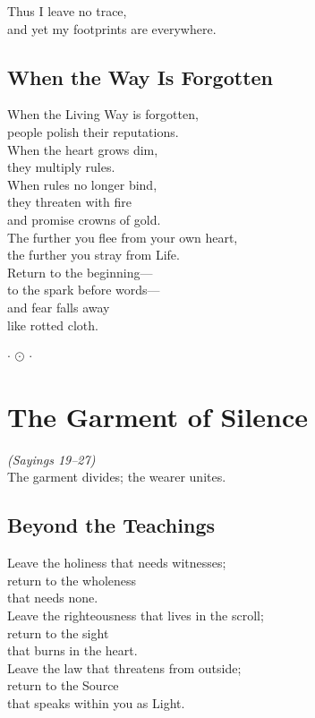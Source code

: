 \documentclass[10pt, openright]{book}
\newcommand{\ornament}{
    \vspace{1.5cm}
    \begin{center}
        \large $\cdot$ $\odot$ $\cdot$
    \end{center}
    \vspace{1.5cm}
}
\begin{document}
Thus I leave no trace, \\
and yet my footprints are everywhere.

\section{When the Way Is Forgotten}
When the Living Way is forgotten, \\
people polish their reputations. \\
When the heart grows dim, \\
they multiply rules. \\
When rules no longer bind, \\
they threaten with fire \\
and promise crowns of gold. \\

The further you flee from your own heart, \\
the further you stray from Life. \\
Return to the beginning--- \\
to the spark before words--- \\
and fear falls away \\
like rotted cloth.
\ornament

\chapter{The Garment of Silence}
\begin{center}
    \textit{(Sayings 19--27)} \\
    \vspace{0.5cm}
    \small The garment divides; the wearer unites.
\end{center}
\vspace{0.5cm}

\section{Beyond the Teachings}
Leave the holiness that needs witnesses; \\
return to the wholeness \\
that needs none. \\
Leave the righteousness that lives in the scroll; \\
return to the sight \\
that burns in the heart. \\
Leave the law that threatens from outside; \\
return to the Source \\
that speaks within you as Light. \\
\end{document}
